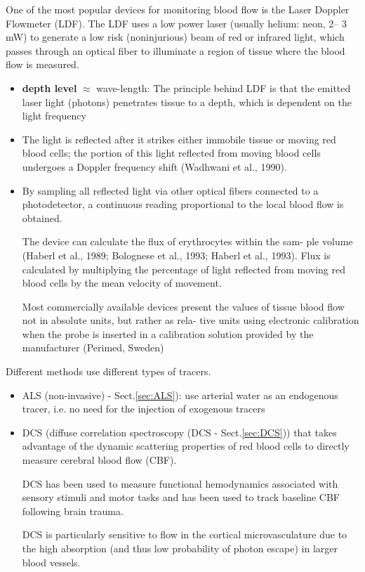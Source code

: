 One of the most popular devices for monitoring blood flow is the Laser Doppler
Flowmeter (LDF). The LDF uses a low power laser (usually helium: neon, 2– 3 mW)
to generate a low risk (noninjurious) beam of red or infrared light, which
passes through an optical fiber to illuminate a region of tissue where the blood
flow is measured.
\begin{itemize}
  
  \item {\bf depth level} $\approx$ wave-length: The principle behind LDF is
  that the emitted laser light (photons) penetrates tissue to a depth, which is
  dependent on the light frequency
  
  \item The light is reflected after it strikes either immobile tissue or moving
  red blood cells; the portion of this light reflected from moving blood cells
  undergoes a Doppler frequency shift (Wadhwani et al., 1990). 
  
  \item By sampling all reflected light via other optical fibers connected to a
  photodetector, a continuous reading proportional to the local blood flow is
  obtained.
  
  The device can calculate the flux of erythrocytes within the sam- ple volume
  (Haberl et al., 1989; Bolognese et al., 1993; Haberl et al., 1993). Flux is
  calculated by multiplying the percentage of light reflected from moving red
  blood cells by the mean velocity of movement.
  
  Most commercially available devices present the values of tissue blood flow
  not in absolute units, but rather as rela- tive units using electronic
  calibration when the probe is inserted in a calibration solution provided by
  the manufacturer (Perimed, Sweden)
  
\end{itemize}

Different methods use different types of tracers.
\begin{itemize}
  \item ALS (non-invasive) - Sect.\ref{sec:ALS}): use arterial water as an
  endogenous tracer, i.e.
  no need for the injection of  exogenous tracers
  
  \item DCS (diffuse correlation spectroscopy (DCS - Sect.\ref{sec:DCS})) that
  takes advantage of the dynamic scattering properties of red blood cells to
  directly measure cerebral blood flow (CBF).

DCS has been used to measure functional hemodynamics associated with sensory
stimuli and motor tasks and has been used to track baseline CBF following brain
trauma.

DCS is particularly sensitive to flow in the cortical microvasculature due to
the high absorption (and thus low probability of photon escape) in larger blood
vessels.
\end{itemize}


